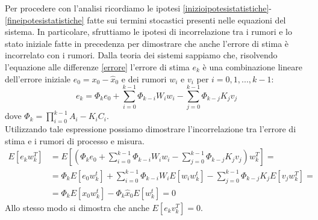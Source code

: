 Per procedere con l'analisi ricordiamo le ipotesi \eqref{inizioipotesistatistiche}-\eqref{fineipotesistatistiche} fatte sui termini stocastici presenti nelle equazioni del sistema.
In particolare, sfruttiamo le ipotesi di incorrelazione tra i rumori e lo stato iniziale fatte in precedenza per dimostrare che anche l'errore di stima è incorrelato con i rumori.
Dalla teoria dei sistemi sappiamo che, risolvendo l'equazione alle differenze \eqref{errore} l'errore di stima $e_k$ è una combinazione lineare dell'errore iniziale $e_0=x_0-\hat{x}_0$ e dei rumori $w_i$ e $v_i$ per $i=0,1,...,k-1$:
\begin{equation}
e_k=\Phi_{k}e_0 + \sum_{i=0}^{k-1}\Phi_{k-i}W_iw_i - \sum_{j=0}^{k-1}\Phi_{k-j}K_jv_j
\end{equation}
dove $\Phi_{k}=\prod_{i=0}^{k-1}A_i-K_iC_i$.\\
Utilizzando tale espressione possiamo dimostrare l'incorrelazione tra l'errore di stima e i rumori di processo e misura.
\begin{equation}
\begin{split}
E[e_kw_k^T]&=E[(\Phi_{k}e_0 + \sum_{i=0}^{k-1}\Phi_{k-i}W_iw_i - \sum_{j=0}^{k-1}\Phi_{k-j}K_jv_j)w_k^T]=\\
&=\Phi_kE[e_0w_k^t] + \sum_{i=0}^{k-1}\Phi_{k-i}W_iE[w_iw_k^t] - \sum_{j=0}^{k-1}\Phi_{k-j}K_jE[v_jw_k^T]=\\
&=\Phi_kE[x_0w_k^t] - \Phi_k\hat{x}_0E[w_k^t] = 0
\end{split}
\end{equation}
Allo stesso modo si dimostra che anche $E[e_kv_k^T]=0$.
\newpage
